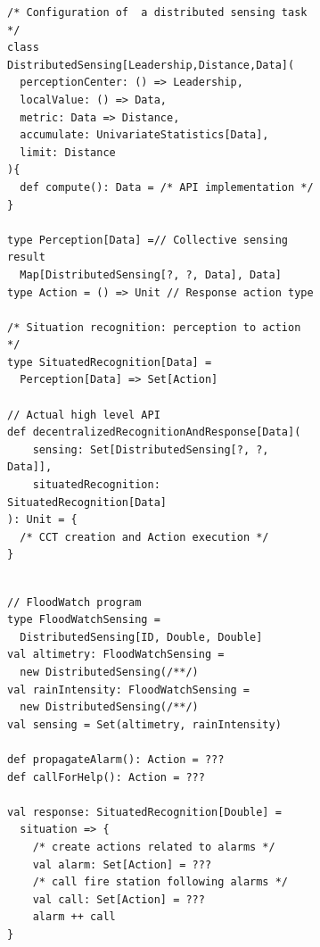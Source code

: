 
\begin{figure}
  \begin{subfigure}[b]{0.49\linewidth}
    \centering
    \begin{lstlisting}[language=scafi]
/* Configuration of  a distributed sensing task */
class DistributedSensing[Leadership,Distance,Data](
  perceptionCenter: () => Leadership,
  localValue: () => Data,
  metric: Data => Distance,
  accumulate: UnivariateStatistics[Data],
  limit: Distance
){ 
  def compute(): Data = /* API implementation */ 
}

type Perception[Data] =// Collective sensing result
  Map[DistributedSensing[?, ?, Data], Data]
type Action = () => Unit // Response action type

/* Situation recognition: perception to action */
type SituatedRecognition[Data] =
  Perception[Data] => Set[Action]

// Actual high level API
def decentralizedRecognitionAndResponse[Data](
    sensing: Set[DistributedSensing[?, ?, Data]],
    situatedRecognition: SituatedRecognition[Data]
): Unit = { 
  /* CCT creation and Action execution */ 
}
    
\end{lstlisting}
  \label{code:api}
  \end{subfigure}
  \hfill
  \begin{subfigure}[b]{0.49\linewidth}
    \centering
\begin{lstlisting}[language=scafi]
// FloodWatch program
type FloodWatchSensing = 
  DistributedSensing[ID, Double, Double]
val altimetry: FloodWatchSensing = 
  new DistributedSensing(/**/)
val rainIntensity: FloodWatchSensing = 
  new DistributedSensing(/**/)
val sensing = Set(altimetry, rainIntensity)

def propagateAlarm(): Action = ???
def callForHelp(): Action = ???

val response: SituatedRecognition[Double] = 
  situation => {
    /* create actions related to alarms */
    val alarm: Set[Action] = ???
    /* call fire station following alarms */
    val call: Set[Action] = ???
    alarm ++ call
}


\end{lstlisting}
\end{subfigure}
\end{figure}
